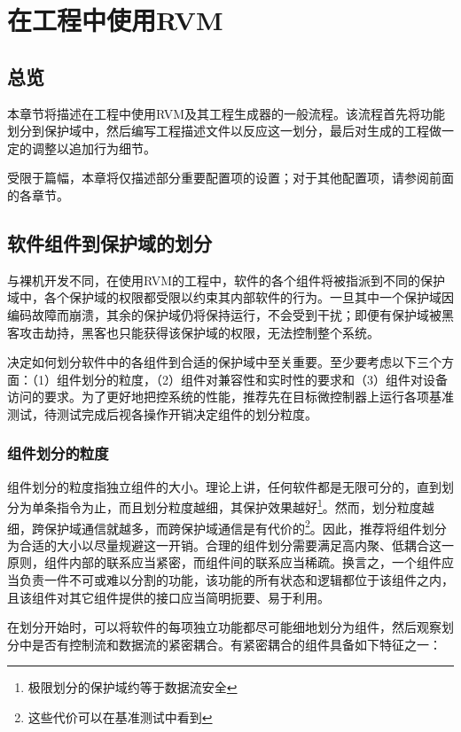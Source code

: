 \chapter{在工程中使用RVM}\label{ch:6-using-rvm}

\section{总览}\label{sec:6-1}

本章节将描述在工程中使用RVM及其工程生成器的一般流程。该流程首先将功能划分到保护域中，然后编写工程描述文件以反应这一划分，最后对生成的工程做一定的调整以追加行为细节。

受限于篇幅，本章将仅描述部分重要配置项的设置；对于其他配置项，请参阅前面的各章节。

\section{软件组件到保护域的划分}\label{sec:6-2}

与裸机开发不同，在使用RVM的工程中，软件的各个组件将被指派到不同的保护域中，各个保护域的权限都受限以约束其内部软件的行为。一旦其中一个保护域因编码故障而崩溃，其余的保护域仍将保持运行，不会受到干扰；即便有保护域被黑客攻击劫持，黑客也只能获得该保护域的权限，无法控制整个系统。

决定如何划分软件中的各组件到合适的保护域中至关重要。至少要考虑以下三个方面：（1）组件划分的粒度，（2）组件对兼容性和实时性的要求和（3）组件对设备访问的要求。为了更好地把控系统的性能，推荐先在目标微控制器上运行各项基准测试，待测试完成后视各操作开销决定组件的划分粒度。

\subsection{组件划分的粒度}\label{subsec:6-2-1}

组件划分的粒度指独立组件的大小。理论上讲，任何软件都是无限可分的，直到划分为单条指令为止，而且划分粒度越细，其保护效果越好\footnote{极限划分的保护域约等于数据流安全}。然而，划分粒度越细，跨保护域通信就越多，而跨保护域通信是有代价的\footnote{这些代价可以在基准测试中看到}。因此，推荐将组件划分为合适的大小以尽量规避这一开销。合理的组件划分需要满足高内聚、低耦合这一原则，组件内部的联系应当紧密，而组件间的联系应当稀疏。换言之，一个组件应当负责一件不可或难以分割的功能，该功能的所有状态和逻辑都位于该组件之内，且该组件对其它组件提供的接口应当简明扼要、易于利用。

在划分开始时，可以将软件的每项独立功能都尽可能细地划分为组件，然后观察划分中是否有控制流和数据流的紧密耦合。有紧密耦合的组件具备如下特征之一：

